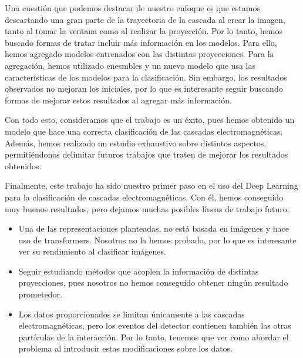 \documentclass[a4paper,12pt,oneside,titlepage]{book}
\begin{document}
Una cuestión que podemos destacar de nuestro enfoque es que estamos descartando una gran parte de la trayectoria de la cascada al crear la imagen, tanto al tomar la ventana como al realizar la proyección. Por lo tanto, hemos buscado formas de tratar incluir más información en los modelos. Para ello, hemos agregado modelos entrenados con las distintas proyecciones. Para la agregación, hemos utilizado enesmbles y un nuevo modelo que usa las características de los modelos para la clasificación. Sin embargo, los resultados observados no mejoran los iniciales, por lo que es interesante seguir buscando formas de mejorar estos resultados al agregar más información. 

Con todo esto, consideramos que el trabajo es un éxito, pues hemos obtenido un modelo que hace una correcta clasificación de las cascadas electromagnéticas. Además, hemos realizado un estudio exhaustivo sobre distintos aspectos, permitiéndonos delimitar futuros trabajos que traten de mejorar los resultados obtenidos.

Finalmente, este trabajo ha sido nuestro primer paso en el uso del Deep Learning para la clasificación de cascadas electromagnéticas. Con él, hemos conseguido muy buenos resultados, pero dejamos muchas posibles líneas de trabajo futuro:

\begin{itemize}
  \item Una de las representaciones planteadas, no está basada en imágenes y hace uso de transformers. Nosotros no la hemos probado, por lo que es interesante ver su rendimiento al clasificar imágenes.
  \item Seguir estudiando métodos que acoplen la información de distintas proyecciones, pues nosotros no hemos conseguido obtener ningún resultado prometedor.
  \item Los datos proporcionados se limitan únicamente a las cascadas electromagnéticas, pero los eventos del detector contienen también las otras partículas de la interacción. Por lo tanto, tenemos que ver como abordar el problema al introducir estas modificaciones sobre los datos. 
\end{itemize}

\end{document}
